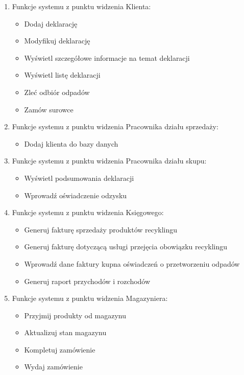 
\begin{enumerate}

\item Funkcje systemu z punktu widzenia Klienta:
	\begin{itemize}
		\item Dodaj deklarację
		\item Modyfikuj deklarację
		\item Wyświetl szczegółowe informacje na temat deklaracji
		\item Wyświetl listę deklaracji
		\item Zleć odbiór odpadów
		\item Zamów surowce
	\end{itemize}

\item Funkcje systemu z punktu widzenia Pracownika działu sprzedaży:
	\begin{itemize}
		\item Dodaj klienta do bazy danych
	\end{itemize} 

\item Funkcje systemu z punktu widzenia Pracownika działu skupu:
	\begin{itemize}
		\item Wyświetl podsumowania deklaracji
		\item Wprowadź oświadczenie odzysku
	\end{itemize}

\item Funkcje systemu z punktu widzenia Księgowego:
	\begin{itemize}
		\item Generuj fakturę sprzedaży produktów recyklingu
		\item Generuj fakturę dotyczącą usługi przejęcia obowiązku recyklingu
		\item Wprowadź dane faktury kupna oświadczeń o przetworzeniu odpadów
		\item Generuj raport przychodów i rozchodów
	\end{itemize}

\item Funkcje systemu z punktu widzenia Magazyniera:
	\begin{itemize}
		\item Przyjmij produkty od magazynu 
		\item Aktualizuj stan magazynu
		\item Kompletuj zamówienie
		\item Wydaj zamówienie
	\end{itemize}


\end{enumerate}
